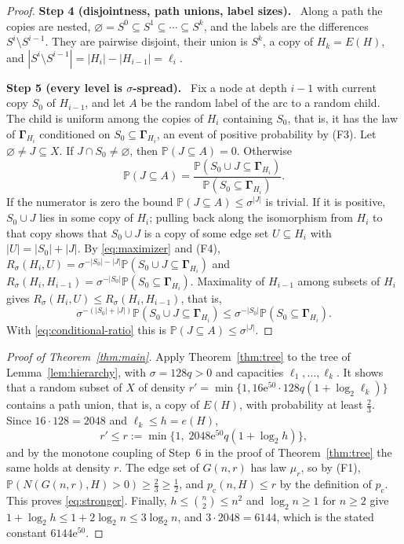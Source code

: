\documentclass[11pt]{article}
\numberwithin{equation}{section}
\newcommand{\PP}{\mathbb P}
\newcommand{\pc}{p_{\mathrm c}}
\newcommand{\ee}{\mathrm e}
\newcommand{\GG}{\boldsymbol\Gamma}
\newcommand{\step}[2]{\par\medskip\noindent\textbf{Step #1 (#2).}\ }
\begin{document}
\begin{proof}
\step{4}{disjointness, path unions, label sizes}
Along a path the copies are nested,
$\varnothing=S^0\subseteq S^1\subseteq\cdots\subseteq S^k$, and the
labels are the differences $S^i\setminus S^{i-1}$. They are pairwise
disjoint, their union is $S^k$, a copy of $H_k=E(H)$, and
$|S^i\setminus S^{i-1}|=|H_i|-|H_{i-1}|=\ell_i$.

\step{5}{every level is $\sigma$-spread}
Fix a node at depth $i-1$ with current copy $S_0$ of $H_{i-1}$, and let
$A$ be the random label of the arc to a random child. The child is
uniform among the copies of $H_i$ containing $S_0$, that is, it has the
law of $\GG_{H_i}$ conditioned on $S_0\subseteq\GG_{H_i}$, an event of
positive probability by (F3). Let $\varnothing\ne J\subseteq X$. If
$J\cap S_0\ne\varnothing$, then $\PP(J\subseteq A)=0$. Otherwise
\begin{equation}\label{eq:conditional-ratio}
 \PP(J\subseteq A)=
 \frac{\PP(S_0\cup J\subseteq\GG_{H_i})}
      {\PP(S_0\subseteq\GG_{H_i})}.
\end{equation}
If the numerator is zero the bound $\PP(J\subseteq A)\le\sigma^{|J|}$
is trivial. If it is positive, $S_0\cup J$ lies in some copy of $H_i$;
pulling back along the isomorphism from $H_i$ to that copy shows that
$S_0\cup J$ is a copy of some edge set $U\subseteq H_i$ with
$|U|=|S_0|+|J|$. By \eqref{eq:maximizer} and (F4),
$R_\sigma(H_i,U)=\sigma^{-|S_0|-|J|}\PP(S_0\cup J\subseteq\GG_{H_i})$
and
$R_\sigma(H_i,H_{i-1})=\sigma^{-|S_0|}\PP(S_0\subseteq\GG_{H_i})$.
Maximality of $H_{i-1}$ among subsets of $H_i$ gives
$R_\sigma(H_i,U)\le R_\sigma(H_i,H_{i-1})$, that is,
\[
 \sigma^{-(|S_0|+|J|)}\PP(S_0\cup J\subseteq\GG_{H_i})
 \le \sigma^{-|S_0|}\PP(S_0\subseteq\GG_{H_i}).
\]
With \eqref{eq:conditional-ratio} this is
$\PP(J\subseteq A)\le\sigma^{|J|}$.
\end{proof}

\begin{proof}[Proof of Theorem~\ref{thm:main}]
Apply Theorem~\ref{thm:tree} to the tree of Lemma~\ref{lem:hierarchy},
with $\sigma=128q>0$ and capacities $\ell_1,\ldots,\ell_k$. It shows
that a random subset of $X$ of density
$r'=\min\{1,16\ee^{50}\cdot128q(1+\log_2\ell_k)\}$ contains a path
union, that is, a copy of $E(H)$, with probability at least $\frac23$.
Since $16\cdot128=2048$ and $\ell_k\le h=e(H)$,
\[
 r'\le r:=\min\{1,\;2048\ee^{50}q(1+\log_2 h)\},
\]
and by the monotone coupling of Step~6 in the proof of
Theorem~\ref{thm:tree} the same holds at density $r$. The edge set of
$G(n,r)$ has law $\mu_r$, so by (F1),
$\PP(N(G(n,r),H)>0)\ge\frac23\ge\frac12$, and $\pc(n,H)\le r$ by the
definition of $\pc$. This proves \eqref{eq:stronger}. Finally,
$h\le\binom n2\le n^2$ and $\log_2n\ge1$ for $n\ge2$ give
$1+\log_2 h\le1+2\log_2n\le3\log_2 n$, and $3\cdot2048=6144$, which is
the stated constant $6144\ee^{50}$.
\end{proof}
\end{document}
